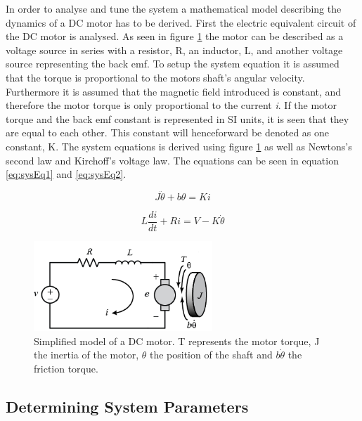\documentclass[../../main.tex]{subfiles}
\begin{document}
In order to analyse and tune the system a mathematical model describing the dynamics of a DC motor has to be derived. First the electric equivalent circuit of the DC motor is analysed. As seen in figure \ref{fig:Armature_Circuit} the motor can be described as a voltage source in series with a resistor, R, an inductor, L, and another voltage source representing the back emf. To setup the system equation it is assumed that the torque is proportional to the motors shaft's angular velocity. Furthermore it is assumed that the magnetic field introduced is constant, and therefore the motor torque is only proportional to the current \textit{i}. If the motor torque and the back emf constant is represented in SI units, it is seen that they are equal to each other. This constant will henceforward be denoted as one constant, K. The system equations is derived using figure \ref{fig:Armature_Circuit} as well as Newtons's second law and Kirchoff's voltage law. The equations can be seen in equation \ref{eq:sysEq1} and \ref{eq:sysEq2}.

\begin{equation}
    J\ddot{\theta}+b\theta = K i
    \label{eq:sysEq1}
\end{equation}

\begin{equation}
    L \frac{di}{dt} + R i = V -K \dot{\theta}
    \label{eq:sysEq2}
\end{equation}


\begin{figure}[H]
    \centering
    \includegraphics[width=0.6\textwidth]{Sections/System_Modelling/Images/Armature_Layout.PNG}
    \caption{Simplified model of a DC motor. T represents the motor torque, J the inertia of the motor, $\theta$ the position of the shaft and $b\dot{\theta}$ the friction torque. \cite{universityofmichigan2019}}
    \label{fig:Armature_Circuit}
\end{figure}

\subsection{Determining System Parameters}\label{subsec:motorParameters}
\end{document}

